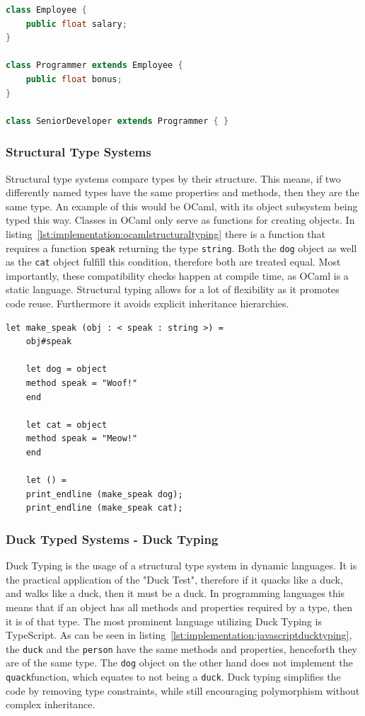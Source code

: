 \begin{lstlisting}[language=Java,caption=Example of nominal typing in Java,label=lst:implementation:javanominaltyping]
class Employee {
	public float salary;
}

class Programmer extends Employee {
	public float bonus;
}

class SeniorDeveloper extends Programmer { }
\end{lstlisting}

\subsubsection{Structural Type Systems}

Structural type systems compare types by their structure. This means, if two differently named types have the same properties and methods, then they are the same type. An example of this would be OCaml, with its object subsystem being typed this way. Classes in OCaml only serve as functions for creating objects. In listing~\ref{lst:implementation:ocamlstructuraltyping} there is a function that requires a function \lstinline|speak| returning the type \lstinline|string|. Both the \lstinline|dog| object as well as the \lstinline|cat| object fulfill this condition, therefore both are treated equal. Most importantly, these compatibility checks happen at compile time, as OCaml is a static language. Structural typing allows for a lot of flexibility as it promotes code reuse. Furthermore it avoids explicit inheritance hierarchies.

\begin{lstlisting}[language=caml,caption=Example of structural typing in Ocaml,label=lst:implementation:ocamlstructuraltyping]
	let make_speak (obj : < speak : string >) =
	obj#speak

	let dog = object
	method speak = "Woof!"
	end

	let cat = object
	method speak = "Meow!"
	end

	let () =
	print_endline (make_speak dog);
	print_endline (make_speak cat);
\end{lstlisting}

\subsubsection{Duck Typed Systems - Duck Typing}

Duck Typing is the usage of a structural type system in dynamic languages. It is the practical application of the "Duck Test", therefore if it quacks like a duck, and walks like a duck, then it must be a duck. In programming languages this means that if an object has all methods and properties required by a type, then it is of that type. The most prominent language utilizing Duck Typing is TypeScript. As can be seen in listing~\ref{lst:implementation:javascriptducktyping}, the \lstinline|duck| and the \lstinline|person| have the same methods and properties, henceforth they are of the same type. The \lstinline|dog| object on the other hand does not implement the \lstinline|quack|function, which equates to not being a \lstinline|duck|. Duck typing simplifies the code by removing type constraints, while still encouraging polymorphism without complex inheritance.

